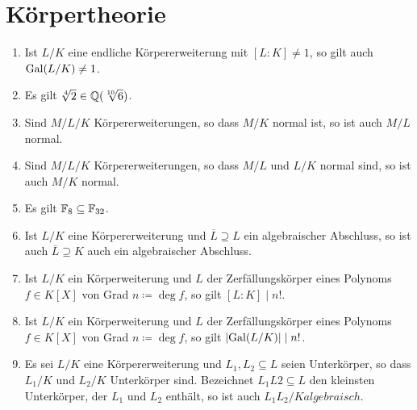\section{Körpertheorie}


\begin{question}[subtitle = Wahr oder Falsch?]
  \begin{enumerate}
    \item
      Ist $L/K$ eine endliche Körpererweiterung mit $[L : K] \neq 1$, so gilt auch $\operatorname{Gal}(L/K) \neq 1$.
    \item
      Es gilt $\sqrt[4]{2} \in \mathbb{Q}(\sqrt[10]{6})$.
    \item
      Sind $M/L/K$ Körpererweiterungen, so dass $M/K$ normal ist, so ist auch $M/L$ normal.
    \item
      Sind $M/L/K$ Körpererweiterungen, so dass $M/L$ und $L/K$ normal sind, so ist auch $M/K$ normal.
    \item
      Es gilt $\mathbb{F}_{8} \subseteq \mathbb{F}_{32}$.
    \item
      Ist $L/K$ eine Körpererweiterung und $\overline{L} \supseteq L$ ein algebraischer Abschluss, so ist auch $\overline{L} \supseteq K$ auch ein algebraischer Abschluss.
    \item
      Ist $L/K$ ein Körperweiterung und $L$ der Zerfällungskörper eines Polynoms $f \in K[X]$ von Grad $n \coloneqq \deg f$, so gilt $[L : K] \mid n!$.
    \item
      Ist $L/K$ ein Körperweiterung und $L$ der Zerfällungskörper eines Polynoms $f \in K[X]$ von Grad $n \coloneqq \deg f$, so gilt $|{\operatorname{Gal}(L/K)}| \mid n!$.
    \item
      Es sei $L/K$ eine Körpererweiterung und $L_1, L_2 \subseteq L$ seien Unterkörper, so dass $L_1/K$ und $L_2/K$ Unterkörper sind.
      Bezeichnet $L_1 L2 \subseteq L$ den kleinsten Unterkörper, der $L_1$ und $L_2$ enthält, so ist auch $L_1 L_2/K algebraisch$.
  \end{enumerate}
\end{question}


